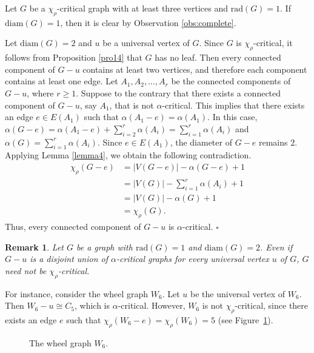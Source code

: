 \documentclass[12pt]{article}
\newtheorem{remark}{Remark}
\newcommand{\proof}{\noindent{\bf Proof.\ }}
\newcommand{\qed}{\hfill $\square$ \bigskip}
\begin{document}
\proof Let $G$ be a $\chi_\rho$-critical graph with at least three vertices and $\mathrm{rad}(G) = 1$.  If $\mathrm{diam}(G) = 1$, then it is clear by Observation \ref{obs:complete}.

Let  $\mathrm{diam}(G) = 2$ and $u$ be a universal vertex of $G$. 
Since $G$ is $\chi_\rho$-critical, it follows from Proposition \ref{pro14} that $G$ has no leaf. Then every connected component of $G - u$ contains at least two vertices, and therefore each component contains at least one edge.
Let $A_1, A_2, \dots, A_r$ be the connected components of $G-u$, where $r \geq 1$. 
Suppose to the contrary that there exists a connected component of $G-u$, say $A_1$, that is not $\alpha$-critical. This implies that there exists an edge $e \in E\left(A_1\right)$ such that $\alpha\left(A_1-e\right)=\alpha\left(A_1\right)$. In this case, $\alpha(G-e)=\alpha(A_1-e)+\sum_{i=2}^{r} \alpha(A_i)=\sum_{i=1}^{r} \alpha(A_i)$ and $\alpha(G)=\sum_{i=1}^{r} \alpha(A_i)$.
Since $e \in E(A_1)$, the diameter of $G-e$ remains $2$. Applying  Lemma \ref{lemma4}, we obtain the following contradiction.
\begin{align*}
\chi_\rho(G-e)&=|V(G-e)| - \alpha(G-e)  + 1
\\ &=|V(G)| - \sum_{i=1}^{r} \alpha(A_i) + 1 \\ &=|V(G)| - \alpha(G)  + 1\\ &=\chi_\rho(G).
\end{align*}
Thus, every connected component of $G-u$ is $\alpha$-critical. 
\qed

\begin{remark}
Let $G$ be a graph with $\mathrm{rad}(G)=1$ and $\mathrm{diam}(G)=2$. Even if $G-u$ is a disjoint union of $\alpha$-critical graphs for every universal vertex $u$ of $G$, $G$ need not be $\chi_\rho$-critical.
\end{remark}

For instance, consider the wheel graph $W_6$. Let $u$ be the universal vertex of $W_6$. Then $W_6-u \cong C_5$, which is $\alpha$-critical.
However, $W_6$ is not $\chi_\rho$-critical, since there exists an edge $e$ such that $\chi_\rho(W_6-e)=\chi_\rho(W_6)=5$ (see Figure~\ref{fig3}).

\begin{figure}[H]
\centering
{}
\caption{The wheel graph $W_6$.}
\label{fig3}
\end{figure}
\end{document}
